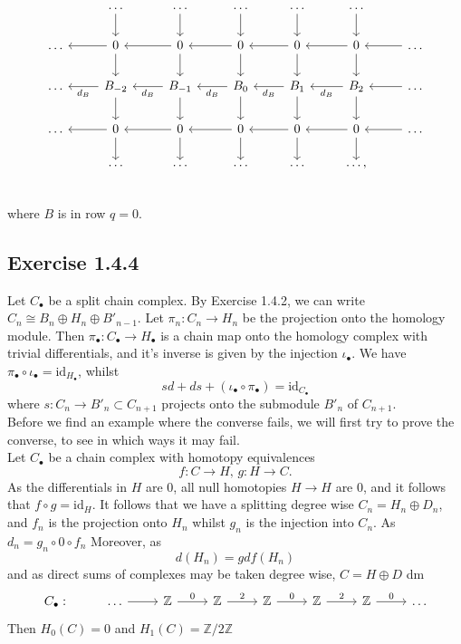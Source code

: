 \documentclass{article}
\theoremstyle{definition}
\newcommand{\Z}{\mathbb{Z}}
\newcommand{\id}{\text{id}}
\begin{document}
\[
\begin{tikzcd}
	& \ldots \arrow[d] 
	& \ldots \arrow[d]
	& \ldots \arrow[d] 
	& \ldots \arrow[d]
	& \ldots \arrow[d] 
	\\
	\ldots
	& 0 \arrow[l] \arrow[d] 
	& 0 \arrow[l] \arrow[d] 
	& 0 \arrow[l] \arrow[d] 
	& 0 \arrow[l] \arrow[d] 
	& 0 \arrow[l] \arrow[d] 
	& \ldots \arrow[l]
	\\
	\ldots
	& B_{-2} \arrow[l, "d_B"] \arrow[d] 
	& B_{-1} \arrow[l, "d_B"] \arrow[d] 
	& B_{0} \arrow[l, "d_B"] \arrow[d] 
	& B_{1} \arrow[l, "d_B"] \arrow[d] 
	& B_{2} \arrow[l, "d_B"] \arrow[d] 
	& \ldots \arrow[l]
	\\
	\ldots
	& 0 \arrow[l] \arrow[d] 
	& 0 \arrow[l] \arrow[d] 
	& 0 \arrow[l] \arrow[d] 
	& 0 \arrow[l] \arrow[d] 
	& 0 \arrow[l] \arrow[d] 
	& \ldots \arrow[l]
	\\
	& \ldots
	& \ldots
	& \ldots
	& \ldots
	& \ldots,
	\\
\end{tikzcd}
\]
where $B$ is in row $q = 0$.

\subsection*{Exercise 1.4.4}

Let $C_{\bullet}$ be a split chain complex. By Exercise 1.4.2, we can write
$C_n \cong B_n \oplus H_n \oplus B'_{n - 1}$. Let $\pi_{n} : C_n \to H_n$ be the
projection onto the homology module. Then $\pi_{\bullet} : C_{\bullet} \to
H_{\bullet}$ is a chain map onto the homology complex with trivial
differentials, and it's inverse is given by the injection $\iota_{\bullet}$.
We have $\pi_{\bullet} \circ \iota_{\bullet} = \id_{H_{\bullet}}$, whilst 
\[
	sd + ds + (\iota_{\bullet} \circ \pi_{\bullet}) = \id_{C_{\bullet}}
\] 
where $s : C_n \to B'_{n} \subset C_{n + 1}$ projects onto the submodule
$B'_{n}$ of $C_{n + 1}$. \\

Before we find an example where the converse fails, we will first try
to prove the converse, to see in which ways it may fail. \\

Let $C_{\bullet}$ be a chain complex with homotopy equivalences 
\[
	f : C \to H,\,
	g : H \to C.
\] 
As the differentials in $H$ are $0$, all null homotopies $H \to H$ are $0$, and
it follows that $f \circ g = \id_H$. It follows that we have a splitting degree
wise $C_n = H_n \oplus D_n$, and $f_n$ is the projection onto $H_n$ whilst
$g_n$ is the injection into $C_n$. As $d_n = g_n \circ 0 \circ f_n$
Moreover, as
\[
	d(H_n)
	=
	gdf(H_n)
\]
and as direct sums of complexes may be taken degree wise,
$C = H \oplus D$
dm
\[
\begin{tikzcd}
	C_{\bullet} :
	& \ldots 
	\ar{r}
	& \Z
	\ar{r}{0}
	& \Z
	\ar{r}{2}
	& \Z
	\ar{r}{0}
	& \Z
	\ar{r}{2}
	& \Z
	\ar{r}{0}
	& \ldots
\end{tikzcd}
\]
Then $H_0(C) = 0$ and $H_1(C) = \Z/2\Z$
\end{document}
